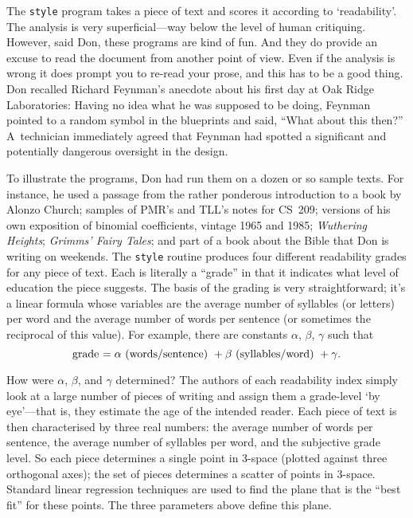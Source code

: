 The {\tt style} program  takes a piece of text and scores it according to
`readability'. The analysis is very superficial---way below the
level of human critiquing. However, said Don, these programs are kind of fun.
And they do provide an excuse to read the document from another point
of view. Even if the analysis is wrong it does prompt you to re-read
your prose, and this has to be a good thing.  Don recalled Richard
Feynman's anecdote about his first day at Oak Ridge Laboratories:
Having no idea what he was supposed to be doing, Feynman pointed to a
random symbol in the blueprints and said, ``What about this then?''  
A~technician immediately agreed that Feynman had spotted a significant
and potentially dangerous oversight in the design.

To illustrate the programs, Don had run them on a dozen or so sample
texts. For instance, he used a passage from the rather ponderous
introduction to a book by Alonzo Church; samples of PMR's and TLL's
notes for CS~209;
versions of his own exposition of  binomial coefficients, vintage
 1965 and 1985;
{\sl Wuthering Heights\/}; {\sl Grimms'
Fairy Tales\/}; and part of a book about the Bible that Don is 
writing on weekends. The
{\tt style} routine produces four different readability grades
for any piece of text. Each is literally a ``grade'' in that it
indicates what level of education the piece suggests. The basis of the
grading is very straightforward; it's a linear formula whose variables
are the average number of syllables (or letters) per word and the
average number of words per sentence (or sometimes the reciprocal
of this value). For example, there are constants $\alpha$, $\beta$,
$\gamma$ such that
$$\hbox{grade $= \alpha$ (words/sentence) $\null + \beta$ (syllables/word)
$\null+ \gamma$.}$$

How were $\alpha$, $\beta$, and
$\gamma$ determined? The authors of each readability
 index simply look at a large number
of pieces of writing and assign them a grade-level `by eye'---that is,
they estimate the age of the intended reader.  Each piece of text is then
characterised by three real numbers: 
the average number of words per sentence, 
the average number of syllables per word, 
and the subjective grade level.
So each piece determines a single point in
3-space (plotted against three orthogonal axes); the set of pieces
determines a scatter of points in 3-space. Standard linear regression
techniques are used to find the plane that is the ``best fit'' for these
points. The three parameters above define this plane.

